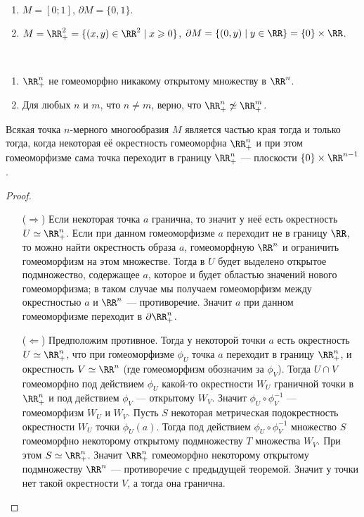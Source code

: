 \documentclass[12pt,a4paper]{article}
\begin{document}
    \begin{example}\ 
        \begin{enumerate}
            \item $M = [0; 1]$, $\partial M = \{0, 1\}$.
            \item $M = \RR^2_+ = \{(x, y) \in \RR^2 \mid x \geqslant 0\}$, $\partial M = \{(0, y) \mid y \in \RR\} = \{0\} \times \RR$.
        \end{enumerate}
    \end{example}

    \begin{theorem}\ 
        \begin{enumerate}
            \item $\RR^n_+$ не гомеоморфно никакому открытому множеству в $\RR^n$.
            \item Для любых $n$ и $m$, что $n \neq m$, верно, что $\RR^n_+ \not\simeq \RR^m_+$.
        \end{enumerate}
    \end{theorem}

    \begin{corollary}
        Всякая точка $n$-мерного многообразия $M$ является частью края тогда и только тогда, когда некоторая её окрестность гомеоморфна $\RR^n_+$ и при этом гомеоморфизме сама точка переходит в границу $\RR^n_+$ --- плоскости $\{0\} \times \RR^{n-1}$.
    \end{corollary}

    \begin{proof}
        \begin{itemize}
            \item[($\Rightarrow$)] Если некоторая точка $a$ гранична, то значит у неё есть окрестность $U \simeq \RR^n_+$. Если при данном гомеоморфизме $a$ переходит не в границу $\RR$, то можно найти окрестность образа $a$, гомеоморфную $\RR^n$ и ограничить гомеоморфизм на этом множестве. Тогда в $U$ будет выделено открытое подмножество, содержащее $a$, которое и будет областью значений нового гомеоморфизма; в таком случае мы получаем гомеоморфизм между окрестностью $a$ и $\RR^n$ --- противоречие. Значит $a$ при данном гомеоморфизме переходит в $\partial \RR^n_+$.
            \item[($\Leftarrow$)] Предположим противное. Тогда у некоторой точки $a$ есть окрестность $U \simeq \RR^n_+$, что при гомеоморфизме $\phi_U$ точка $a$ переходит в границу $\RR^n_+$, и окрестность $V \simeq \RR^n$ (где гомеоморфизм обозначим за $\phi_V$). Тогда $U \cap V$ гомеоморфно под действием $\phi_U$ какой-то окрестности $W_U$ граничной точки в $\RR^n_+$ и под действием $\phi_V$ --- открытому $W_V$. Значит $\phi_U \circ \phi_V^{-1}$ --- гомеоморфизм $W_U$ и $W_V$. Пусть $S$ некоторая метрическая подокрестность окрестности $W_U$ точки $\phi_U(a)$. Тогда под действием $\phi_U \circ \phi_V^{-1}$ множество $S$ гомеоморфно некоторому открытому подмножеству $T$ множества $W_V$. При этом $S \simeq \RR^n_+$. Значит $\RR^n_+$ гомеоморфно некоторому открытому подмножеству $\RR^n$ --- противоречие с предыдущей теоремой. Значит у точки нет такой окрестности $V$, а тогда она гранична.
        \end{itemize}
    \end{proof}
\end{document}
